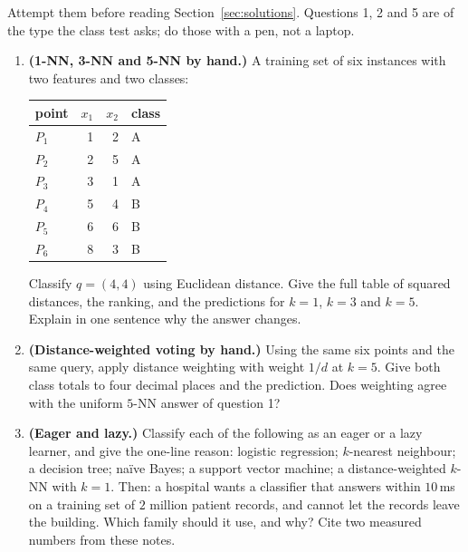 \documentclass[11pt]{article}
\begin{document}
Attempt them before reading Section~\ref{sec:solutions}. Questions 1, 2 and 5
are of the type the class test asks; do those with a pen, not a laptop.

\begin{enumerate}[leftmargin=*, itemsep=0.55em]

\item \textbf{(1-NN, 3-NN and 5-NN by hand.)} A training set of six instances
  with two features and two classes:

  \begin{center}\small
  \begin{tabular}{@{}lrrl@{}}
  \toprule
  point & $x_1$ & $x_2$ & class\\
  \midrule
  $P_1$ & 1 & 2 & A\\
  $P_2$ & 2 & 5 & A\\
  $P_3$ & 3 & 1 & A\\
  $P_4$ & 5 & 4 & B\\
  $P_5$ & 6 & 6 & B\\
  $P_6$ & 8 & 3 & B\\
  \bottomrule
  \end{tabular}
  \end{center}

  Classify $q = (4, 4)$ using Euclidean distance. Give the full table of
  squared distances, the ranking, and the predictions for $k=1$, $k=3$ and
  $k=5$. Explain in one sentence why the answer changes.

\item \textbf{(Distance-weighted voting by hand.)} Using the same six points
  and the same query, apply distance weighting with weight $1/d$ at $k=5$.
  Give both class totals to four decimal places and the prediction. Does
  weighting agree with the uniform $5$-NN answer of question 1?

\item \textbf{(Eager and lazy.)} Classify each of the following as an eager or
  a lazy learner, and give the one-line reason:
  logistic regression; $k$-nearest neighbour; a decision tree; na\"ive Bayes; a
  support vector machine; a distance-weighted $k$-NN with $k=1$.
  Then: a hospital wants a classifier that answers within $10$\,ms on a
  training set of $2$ million patient records, and cannot let the records
  leave the building. Which family should it use, and why? Cite two measured
  numbers from these notes.


\end{enumerate}
\end{document}
